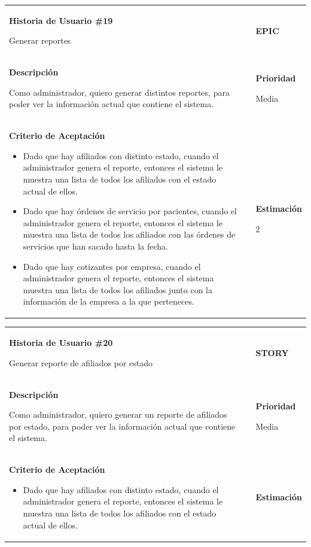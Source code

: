\documentclass[12pt,a4paper]{article}
\begin{document}
\begin{center}
\begin{tabular}{|>{\columncolor[RGB]{215, 215, 215}} p{10cm} >{\columncolor[RGB]{215, 215, 215}} c >{\columncolor[RGB]{215, 215, 215}} p{2.5cm}|}
\hline 
\textbf{Historia de Usuario \#19}

Generar reportes & & \textbf{{\Large EPIC}} \\ 
\textbf{Descripción}

Como administrador, quiero generar distintos reportes, para poder ver la
información actual que contiene el sistema. &  & \textbf{Prioridad}

Media\\

\textbf{Criterio de Aceptación}

\begin{itemize}
\item Dado que hay afiliados con distinto estado, cuando el
administrador genera el reporte, entonces el sistema le muestra
una lista de todos los afiliados con el estado actual de ellos.
\item Dado que hay órdenes de servicio por pacientes, cuando el
administrador genera el reporte, entonces el sistema le muestra
una lista de todos los afiliados con las órdenes de servicios que
han sacado hasta la fecha.
\item Dado que hay cotizantes por empresa, cuando el administrador
genera el reporte, entonces el sistema muestra una lista de todos
los afiliados junto con la información de la empresa a la que
perteneces.
\end{itemize} & & \textbf{Estimación}

2 \\ 
\hline 
\end{tabular}
\vspace{5mm}

\begin{tabular}{| p{10cm} c p{2.5cm}|}
\hline 
\textbf{Historia de Usuario \#20}

Generar reporte de afiliados por estado & & \textbf{{\Large STORY}} \\ 
\textbf{Descripción}

Como administrador, quiero generar un reporte de afiliados por estado,
para poder ver la información actual que contiene el sistema. &  & \textbf{Prioridad}

Media\\

\textbf{Criterio de Aceptación}

\begin{itemize}
\item Dado que hay afiliados con distinto estado, cuando el
administrador genera el reporte, entonces el sistema le muestra
una lista de todos los afiliados con el estado actual de ellos.
\end{itemize} & & \textbf{Estimación}


\end{tabular}
\end{center}
\end{document}
